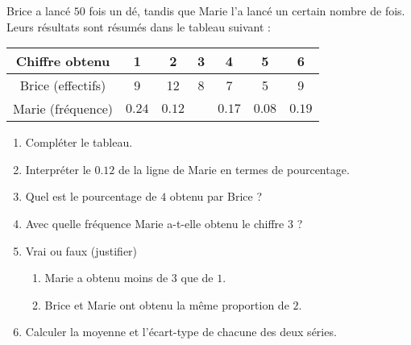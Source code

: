 
\begin{exercice}\label{exosmath-0216}

    Brice a lancé \( 50\) fois un dé, tandis que Marie l'a lancé un certain nombre de fois. Leurs résultats sont résumés dans le tableau suivant :
    \begin{center}
        \begin{tabular}[]{|c||c|c|c|c|c|c|}
            \hline
            Chiffre obtenu&1&2&3&4&5&6\\
            \hline\hline
            Brice (effectifs)&9&12&8&7&5&9\\
            \hline
            Marie (fréquence)&$0.24$&$0.12$&&$0.17$&$0.08$&$0.19$\\
            \hline
        \end{tabular}
    \end{center}
    \begin{enumerate}
        \item
            Compléter le tableau.
        \item
            Interpréter le \( 0.12\) de la ligne de Marie en termes de pourcentage.
            \item
                Quel est le pourcentage de $4$ obtenu par Brice ?
        \item
            Avec quelle fréquence Marie a-t-elle obtenu le chiffre \( 3\) ?
        \item
            Vrai ou faux (justifier)
            \begin{enumerate}
                \item
                    Marie a obtenu moins de \( 3\) que de \( 1\).
                \item
                    Brice et Marie ont obtenu la même proportion de \( 2\).
            \end{enumerate}
        \item
            Calculer la moyenne et l'écart-type de chacune des deux séries.
    \end{enumerate}

\end{exercice}

